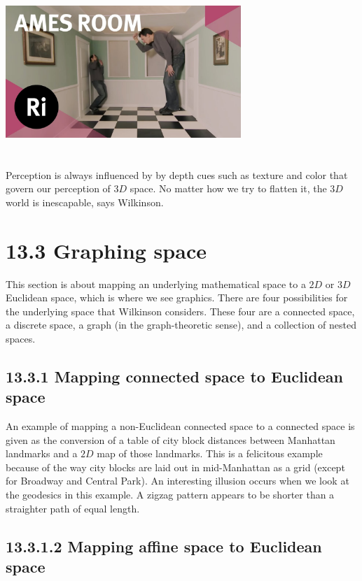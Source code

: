 \includegraphics[width=3.5in,height=2.5in]{fiAmesRoom.jpg}

Perception is always influenced by by depth cues such as texture and
color that govern our perception of \(3D\) space. No matter how we try
to flatten it, the \(3D\) world is inescapable, says Wilkinson.

\hypertarget{graphing-space}{%
\section{13.3 Graphing space}\label{graphing-space}}

This section is about mapping an underlying mathematical space to a
\(2D\) or \(3D\) Euclidean space, which is where we see graphics. There
are four possibilities for the underlying space that Wilkinson
considers. These four are a connected space, a discrete space, a graph
(in the graph-theoretic sense), and a collection of nested spaces.

\hypertarget{mapping-connected-space-to-euclidean-space}{%
\subsection{13.3.1 Mapping connected space to Euclidean
space}\label{mapping-connected-space-to-euclidean-space}}

An example of mapping a non-Euclidean connected space to a connected
space is given as the conversion of a table of city block distances
between Manhattan landmarks and a \(2D\) map of those landmarks. This is
a felicitous example because of the way city blocks are laid out in
mid-Manhattan as a grid (except for Broadway and Central Park). An
interesting illusion occurs when we look at the geodesics in this
example. A zigzag pattern appears to be shorter than a straighter path
of equal length.

\hypertarget{mapping-affine-space-to-euclidean-space}{%
\subsection{13.3.1.2 Mapping affine space to Euclidean
space}\label{mapping-affine-space-to-euclidean-space}}


